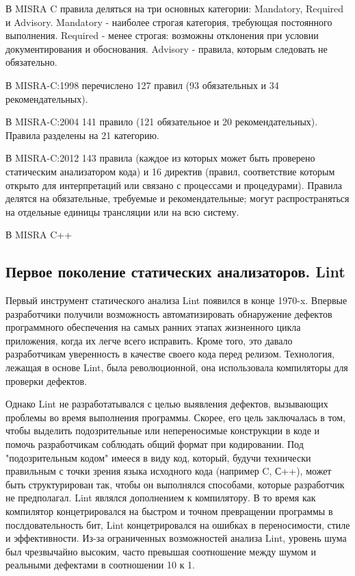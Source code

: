 В MISRA C правила деляться на три основных категории: Mandatory, Required и Advisory. Mandatory -
наиболее строгая категория, требующая постоянного выполнения. Required - менее строгая: возможны 
отклонения при условии документирования и обоснования. Advisory - правила, которым следовать 
не обязательно.

В MISRA-C:1998 перечислено 127 правил (93 обязательных и 34 рекомендательных).

В MISRA-C:2004 141 правило (121 обязательное и 20 рекомендательных). Правила разделены на 21 категорию.

В MISRA-C:2012 143 правила (каждое из которых может быть проверено статическим анализатором кода) и 16 директив 
(правил, соответствие которым открыто для интерпретаций или связано с процессами и процедурами). Правила делятся 
на обязательные, требуемые и рекомендательные; могут распространяться на отдельные единицы трансляции или на всю 
систему.

В MISRA C++ 

\subsection{Первое поколение статических анализаторов. Lint}

Первый инструмент статического анализа Lint появился в конце 1970-x. Впервые разработчики 
получили возможность автоматизировать обнаружение дефектов программного обеспечения на самых 
ранних этапах жизненного цикла приложения, когда их легче всего исправить. Кроме того, это 
давало разработчикам уверенность в качестве своего кода перед релизом. Технология, лежащая в 
основе Lint, была революционной, она использовала компиляторы для проверки дефектов. 

Однако Lint не разработатывался с целью выявления дефектов, вызывающих проблемы во 
время выполнения программы. Скорее, его цель заключалась в том, чтобы выделить подозрительные 
или непереносимые конструкции в коде и помочь разработчикам соблюдать общий формат при 
кодировании. Под "подозрительным кодом" имееся в виду код, который, будучи технически правильным 
с точки зрения языка исходного кода (например C, С++), может быть структурирован так, чтобы он 
выполнялся способами, которые разработчик не предполагал. Lint являлся дополнением к компилятору. В то время как  компилятор концетрировался на быстром и точном превращении программы в послдовательность бит, Lint концетрировался на ошибках в переносимости, стиле и эффективности.
Из-за ограниченных возможностей анализа Lint, уровень шума был чрезвычайно высоким, часто превышая соотношение между шумом и реальными дефектами в соотношении 10 к 1.

